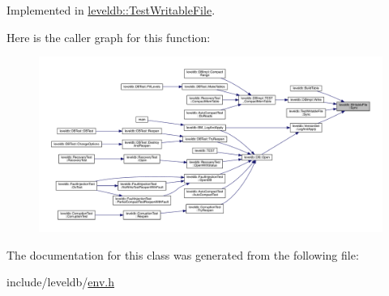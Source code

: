 Implemented in \mbox{\hyperlink{classleveldb_1_1_test_writable_file_aae96a812f1f2e82563b0900dfffaf1d1}{leveldb\+::\+Test\+Writable\+File}}.

Here is the caller graph for this function\+:
\nopagebreak
\begin{figure}[H]
\begin{center}
\leavevmode
\includegraphics[width=350pt]{classleveldb_1_1_writable_file_a2d2dcef02a2c9e71f3d39125bcd5a606_icgraph}
\end{center}
\end{figure}


The documentation for this class was generated from the following file\+:\begin{DoxyCompactItemize}
\item 
include/leveldb/\mbox{\hyperlink{env_8h}{env.\+h}}\end{DoxyCompactItemize}
